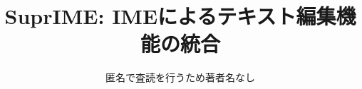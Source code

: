 \documentclass[twoside]{wiss}
\def\system{\textsf{SuprIME}}
\def\papertitle{\system: IMEによるテキスト編集機能の統合}
\begin{document}
\title{\papertitle}
\etitle{} %

\author{匿名で査読を行うため著者名なし
	}



\maketitle















\end{document}
